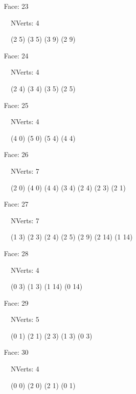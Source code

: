 \documentclass{article}
\begin{document}
{\footnotesize 

Face: 23

\   \    NVerts: 4

 \   \   (2 5) (3 5) (3 9) (2 9)}

{\footnotesize 

Face: 24

\   \    NVerts: 4

 \   \   (2 4) (3 4) (3 5) (2 5)}

{\footnotesize 

Face: 25

\   \    NVerts: 4

 \   \   (4 0) (5 0) (5 4) (4 4)}

{\footnotesize 

Face: 26

\   \    NVerts: 7

 \   \   (2 0) (4 0) (4 4) (3 4) (2 4) (2 3) (2 1)}

{\footnotesize 

Face: 27

\   \    NVerts: 7

 \   \   (1 3) (2 3) (2 4) (2 5) (2 9) (2 14) (1 14)}

{\footnotesize 

Face: 28

\   \    NVerts: 4

 \   \   (0 3) (1 3) (1 14) (0 14)}

{\footnotesize 

Face: 29

\   \    NVerts: 5

 \   \   (0 1) (2 1) (2 3) (1 3) (0 3)}

{\footnotesize 

Face: 30

\   \    NVerts: 4

 \   \   (0 0) (2 0) (2 1) (0 1)}


 \newpage
\end{document}
